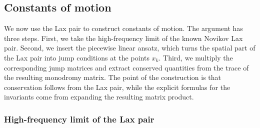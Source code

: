 \documentclass[english,master]{liumaiex}
\theoremstyle{thesisplain}
\theoremstyle{thesisdefinition}
\numberwithin{equation}{section}
\begin{document}
\subsection{Constants of motion}

We now use the Lax pair to construct constants of motion. The argument has three steps. First, we take the high-frequency limit of the known Novikov Lax pair. Second, we insert the piecewise linear ansatz, which turns the spatial part of the Lax pair into jump conditions at the points $x_k$. Third, we multiply the corresponding jump matrices and extract conserved quantities from the trace of the resulting monodromy matrix. The point of the construction is that conservation follows from the Lax pair, while the explicit formulas for the invariants come from expanding the resulting matrix product.

\subsubsection*{High-frequency limit of the Lax pair}
\end{document}

